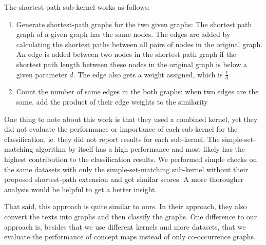 The shortest path sub-kernel works as follows:
\begin{enumerate}
    \item{Generate shortest-path graphs for the two given graphs: The shortest path graph of a given graph has the same nodes.
    The edges are added by calculating the shortest paths between all pairs of nodes in the original graph. An edge is added between two nodes in the shortest path graph if the shortest path length between these nodes in the original graph is below a given parameter $d$. The edge also gets a weight assigned, which is $\frac{1}{d}$}
    \item{Count the number of same edges in the both graphs: when two edges are the same, add the product of their edge weights to the similarity}
\end{enumerate}

One thing to note about this work is that they used a combined kernel, yet they did not evaluate the performance or importance of each sub-kernel for the classification, ie. they did not report results for each sub-kernel.
The simple-set-matching algorithm by itself has a high performance and most likely has the highest contribution to the classification results. We performed simple checks on the same datasets with only the simple-set-matching sub-kernel without their proposed shortest-path extension and got similar scores.
A more thorougher analysis would be helpful to get a better insight.

That said, this approach is quite similar to ours. In their approach, they also convert the texts into graphs and then classify the graphs. One difference to our approach is, besides that we use different kernels and more datasets, that we evaluate the performance of concept maps instead of only co-occurrence graphs.

